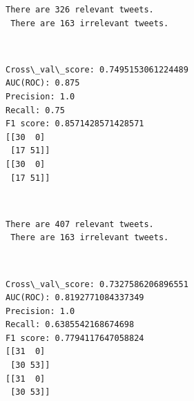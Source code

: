 \documentclass[11pt]{article}
\begin{document}
    \begin{Verbatim}[commandchars=\\\{\}]
There are 326 relevant tweets.
 There are 163 irrelevant tweets.

    \end{Verbatim}

    \begin{center}
    \end{center}
    { \hspace*{\fill} \\}
    
    \begin{Verbatim}[commandchars=\\\{\}]
Cross\_val\_score: 0.7495153061224489
AUC(ROC): 0.875
Precision: 1.0
Recall: 0.75
F1 score: 0.8571428571428571
[[30  0]
 [17 51]]
[[30  0]
 [17 51]]

    \end{Verbatim}

    \begin{center}
    \end{center}
    { \hspace*{\fill} \\}
    
    \begin{Verbatim}[commandchars=\\\{\}]
There are 407 relevant tweets.
 There are 163 irrelevant tweets.

    \end{Verbatim}

    \begin{center}
    \end{center}
    { \hspace*{\fill} \\}
    
    \begin{Verbatim}[commandchars=\\\{\}]
Cross\_val\_score: 0.7327586206896551
AUC(ROC): 0.8192771084337349
Precision: 1.0
Recall: 0.6385542168674698
F1 score: 0.7794117647058824
[[31  0]
 [30 53]]
[[31  0]
 [30 53]]

    \end{Verbatim}

    \begin{center}
    \end{center}
    { \hspace*{\fill} \\}
    
\end{document}
